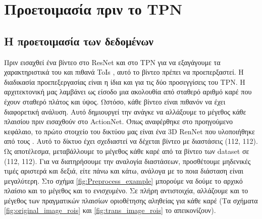 \documentclass{report}
\begin{document}
\section{Προετοιμασία πριν το TPN}

\subsection{Η προετοιμασία των δεδομένων}
Πριν εισαχθεί ένα βίντεο στο   ResNet   και στο   TPN   για να εξαγάγουμε τα χαρακτηριστικά του και πιθανά   ToIs  , αυτό το βίντεο πρέπει να προεπερξαστεί.
Η διαδικασία προεπεξεργασίας είναι η ίδια και για τις δύο προσεγγίσεις του TPN.
Η αρχιτεκτονική μας λαμβάνει ως είσοδο μια ακολουθία από σταθερό αριθμό καρέ  που έχουν σταθερό πλάτος και ύψος. Ωστόσο, κάθε βίντεο είναι πιθανόν να έχει διαφορετική ανάλυση. Αυτό δημιουργεί
την ανάγκε να αλλάξουμε  το μέγεθος κάθε πλαισίου πριν εισαχθούν στο ActionNet. Όπως αναφέρθηκε στο προηγούμενο κεφάλαιο, το πρώτο στοιχείο του δικτύου μας είναι ένα   3D RenNet  
που υλοποιήθηκε από τους   \cite{hara3dcnns}. Αυτό το δίκτυο έχει σχεδιαστεί να δέχεται βίντεο  με διαστάσεις (112, 112).
Ως αποτέλεσμα, μεταβάλλουμε  το μέγεθος κάθε καρέ από τα βίντεο των dataset σε (112, 112). Για να διατηρήσουμε την αναλογία διαστάσεων, προσθέτουμε μηδενικές τιμές 
αριστερά και δεξιά, είτε πάνω και κάτω, ανάλογα με το ποια διάσταση είναι μεγαλύτερη. Στο σχήμα  \ref{fig:Preprocess_example} μπορούμε να δούμε το αρχικό πλαίσιο και το μέγεθος και το ενισχυμένο.
Σε πλήρη αντιστοιχία, αλλάζουμε και το μέγεθος των πραγματικών πλαισίων οριοθέτησης αληθείας για κάθε καρέ (Τα σχήματα \ref{fig:original_image_rois}  και \ref{fig:trans_image_rois} το απεικονίζουν).
\end{document}
